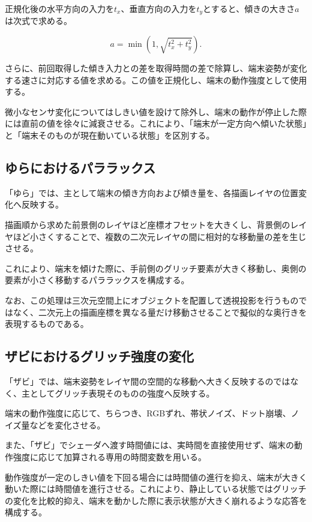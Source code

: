 正規化後の水平方向の入力を$t_x$、垂直方向の入力を$t_y$とすると、傾きの大きさ$a$は次式で求める。

\begin{equation}
a=
\min
\left(
1,
\sqrt{t_x^2+t_y^2}
\right).
\end{equation}

さらに、前回取得した傾き入力との差を取得時間の差で除算し、端末姿勢が変化する速さに対応する値を求める。この値を正規化し、端末の動作強度として使用する。

微小なセンサ変化についてはしきい値を設けて除外し、端末の動作が停止した際には直前の値を徐々に減衰させる。これにより、「端末が一定方向へ傾いた状態」と「端末そのものが現在動いている状態」を区別する。


\subsection{ゆらにおけるパララックス}

「ゆら」では、主として端末の傾き方向および傾き量を、各描画レイヤの位置変化へ反映する。

描画順から求めた前景側のレイヤほど座標オフセットを大きくし、背景側のレイヤほど小さくすることで、複数の二次元レイヤの間に相対的な移動量の差を生じさせる。

これにより、端末を傾けた際に、手前側のグリッチ要素が大きく移動し、奥側の要素が小さく移動するパララックスを構成する。

なお、この処理は三次元空間上にオブジェクトを配置して透視投影を行うものではなく、二次元上の描画座標を異なる量だけ移動させることで擬似的な奥行きを表現するものである。


\subsection{ザビにおけるグリッチ強度の変化}

「ザビ」では、端末姿勢をレイヤ間の空間的な移動へ大きく反映するのではなく、主としてグリッチ表現そのものの強度へ反映する。

端末の動作強度に応じて、ちらつき、RGBずれ、帯状ノイズ、ドット崩壊、ノイズ量などを変化させる。

また、「ザビ」でシェーダへ渡す時間値には、実時間を直接使用せず、端末の動作強度に応じて加算される専用の時間変数を用いる。

動作強度が一定のしきい値を下回る場合には時間値の進行を抑え、端末が大きく動いた際には時間値を進行させる。これにより、静止している状態ではグリッチの変化を比較的抑え、端末を動かした際に表示状態が大きく崩れるような応答を構成する。


